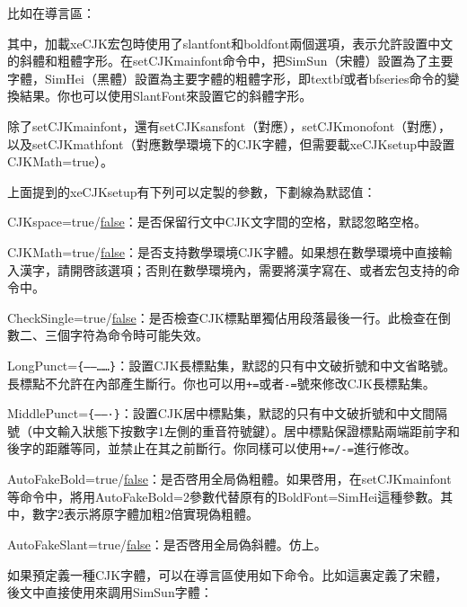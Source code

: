 比如在導言區：
\begin{latex}
\usepackage[slantfont,boldfont]{xeCJK}
\end{latex}

其中，加載xeCJK宏包時使用了slantfont和boldfont兩個選項，表示允許設置中文的斜體和粗體字形。在setCJKmainfont命令中，把SimSun（宋體）設置為了主要字體，SimHei（黑體）設置為主要字體的粗體字形，即textbf或者bfseries命令的變換結果。你也可以使用SlantFont來設置它的斜體字形。

除了setCJKmainfont，還有setCJKsansfont（對應），setCJKmonofont（對應），以及setCJKmathfont（對應數學環境下的CJK字體，但需要載xeCJKsetup中設置CJKMath=true）。

上面提到的xeCJKsetup有下列可以定製的參數，下劃線為默認值：
\begin{feai}
\item CJKspace=true/\uline{false}：是否保留行文中CJK文字間的空格，默認忽略空格。
\item CJKMath=true/\uline{false}：是否支持數學環境CJK字體。如果想在數學環境中直接輸入漢字，請開啓該選項；否則在數學環境內，需要將漢字寫在、或者宏包支持的命令中。
\item CheckSingle=true/\uline{false}：是否檢查CJK標點單獨佔用段落最後一行。此檢查在倒數二、三個字符為命令時可能失效。
\item LongPunct=\verb|{——……}|：設置CJK長標點集，默認的只有中文破折號和中文省略號。長標點不允許在內部產生斷行。你也可以用\texttt{+=}或者\texttt{-=}號來修改CJK長標點集。
\item MiddlePunct=\verb|{——·}|：設置CJK居中標點集，默認的只有中文破折號和中文間隔號（中文輸入狀態下按數字1左側的重音符號鍵）。居中標點保證標點兩端距前字和後字的距離等同，並禁止在其之前斷行。你同樣可以使用\texttt{+=/-=}進行修改。
\item AutoFakeBold=true/\uline{false}：是否啓用全局偽粗體。如果啓用，在setCJKmainfont等命令中，將用AutoFakeBold=2參數代替原有的BoldFont=SimHei這種參數。其中，數字2表示將原字體加粗2倍實現偽粗體。
\item AutoFakeSlant=true/\uline{false}：是否啓用全局偽斜體。仿上。
\end{feai}

如果預定義一種CJK字體，可以在導言區使用如下命令。比如這裏定義了宋體，後文中直接使用來調用SimSun字體：
\begin{latex}
\newCJKfontfamily[song]
\end{latex}

